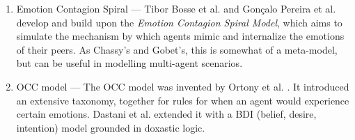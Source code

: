 \documentclass[]{scrartcl}
\begin{document}
\begin{enumerate}
	\item Emotion Contagion Spiral --- Tibor Bosse et al. \cite{DBLP:conf/prima/BosseDMTW09} and Gon\c{c}alo Pereira et al. \cite{DBLP:conf/acii/PereiraDPSP11} develop and build upon the {\em Emotion Contagion Spiral Model}, which aims to simulate the mechanism by which agents mimic and internalize the emotions of their peers. As Chassy's and Gobet's, this is somewhat of a meta-model, but can be useful in modelling multi-agent scenarios.
	
	\item OCC model --- The OCC model was invented by Ortony et al. \cite{ortony1988}. It introduced an extensive taxonomy, together for rules for when an agent would experience certain emotions. Dastani et al. \cite{dastani2011} extended it with a BDI (belief, desire, intention) model grounded in doxastic logic.
\end{enumerate}

\pagebreak

\nocite{*}



\end{document}
